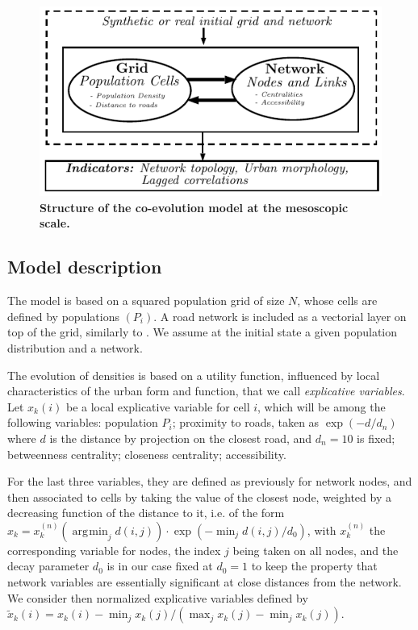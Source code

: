 \documentclass[11pt]{article}
\DeclareMathOperator*{\argmin}{\arg\!\min}
\begin{document}
\begin{figure}
	\includegraphics[width=\linewidth]{figures/mesocoevol.pdf}
	\caption{\textbf{Structure of the co-evolution model at the mesoscopic scale.}\label{fig:mesocoevolmodel:workflow}}
\end{figure}

\subsection{Model description}


The model is based on a squared population grid of size $N$, whose cells are defined by populations $(P_i)$. A road network is included as a vectorial layer on top of the grid, similarly to \cite{raimbault2014hybrid}. We assume at the initial state a given population distribution and a network.

The evolution of densities is based on a utility function, influenced by local characteristics of the urban form and function, that we call \emph{explicative variables}. Let $x_k(i)$ be a local explicative variable for cell $i$, which will be among the following variables: population $P_i$; proximity to roads, taken as $\exp (-d / d_n)$ where $d$ is the distance by projection on the closest road, and $d_n=10$ is fixed; betweenness centrality; closeness centrality; accessibility.

For the last three variables, they are defined as previously for network nodes, and then associated to cells by taking the value of the closest node, weighted by a decreasing function of the distance to it, i.e. of the form $x_k = x^{(n)}_k (\argmin_j d(i,j)) \cdot \exp \left( -  \min_j d(i,j) / d_0 \right)$, with $x^{(n)}_k$ the corresponding variable for nodes, the index $j$ being taken on all nodes, and the decay parameter $d_0$ is in our case fixed at $d_0=1$ to keep the property that network variables are essentially significant at close distances from the network. We consider then normalized explicative variables defined by $\tilde{x}_k(i) = x_k(i) - \min_j x_k(j) / (\max_j x_k(j) - \min_j x_k(j))$.
\end{document}
